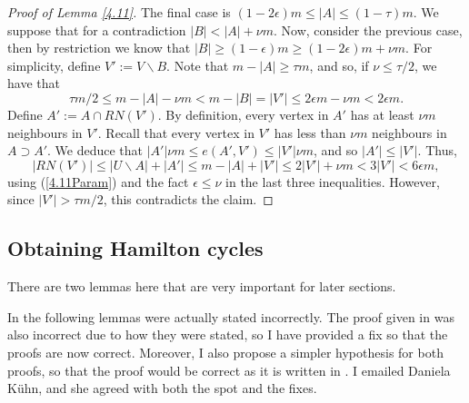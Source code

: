 \documentclass[10pt,letterpaper, reqno]{amsart}
\theoremstyle{definition}
\numberwithin{equation}{section}
\begin{document}
\begin{proof}[Proof of Lemma \ref{4.11}]
	The final case is $(1-2\epsilon)m \leq |A| \leq (1-\tau)m$. We suppose that for a contradiction $|B| < |A| + \nu m$. Now, consider the previous case, then by restriction we know that $|B| \geq (1-\epsilon)m \geq (1-2\epsilon)m + \nu m$. For simplicity, define $V' := V \backslash B$. Note that $m - |A| \geq \tau m$, and so, if $\nu \leq \tau /2$, we have that 
	\begin{equation}\label{4.11Param}
	 \tau m/2 \leq m - |A| - \nu m < m - |B| = |V'| \leq 2\epsilon m - \nu m  < 2\epsilon m.
	\end{equation} 
	Define $A' := A \cap RN(V')$. By definition, every vertex in $A'$ has at least $\nu m $ neighbours in $V'$. Recall that every vertex in $V'$ has less than $\nu m$ neighbours in $A \supset A'$. We deduce that $|A'|\nu m \leq e(A',V') \leq |V'|\nu m$, and so $|A'| \leq |V'|$. Thus,
	$$ |RN(V')| \leq |U\backslash A | + |A'| \leq m - |A| + |V'| \leq 2|V'| + \nu m < 3|V'| < 6 \epsilon m,$$ using (\ref{4.11Param}) and the fact $\epsilon \leq \nu$ in the last three inequalities. However, since $|V'| > \tau m /2$, this contradicts the claim.
\end{proof}

\subsection{Obtaining Hamilton cycles} There are two lemmas here that are very important for later sections.

 In \cite{HamiltonDecomp, ApproxHamiltonDecomp} the following lemmas were actually stated incorrectly. The proof given in \cite{HamiltonDecomp} was also incorrect due to how they were stated, so I have provided a fix so that the proofs are now correct. Moreover, I also propose a simpler hypothesis for both proofs, so that the proof would be correct as it is written in \cite{HamiltonDecomp}. I emailed Daniela K\"{u}hn, and she agreed with both the spot and the fixes. 
\end{document}
